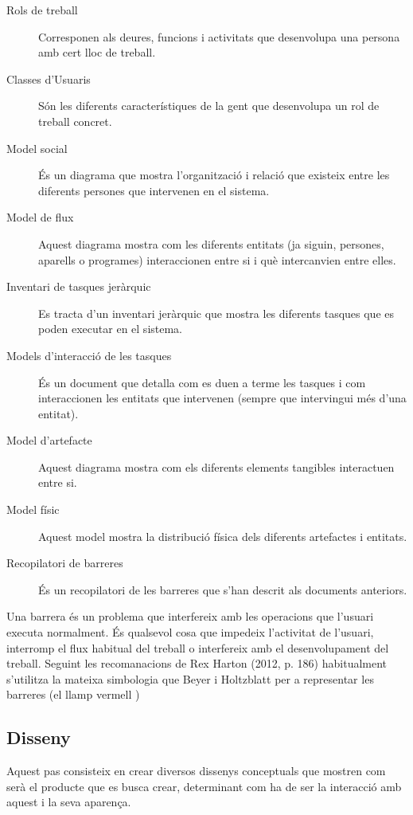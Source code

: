 \begin{description}
\item[Rols de treball] Corresponen als deures, funcions i activitats que desenvolupa una persona amb cert lloc de treball.
\item[Classes d'Usuaris] Són les diferents característiques de la gent que desenvolupa un rol de treball concret.
\item[Model social] És un diagrama que mostra l'organització i relació que existeix entre les diferents persones que intervenen en el sistema.
\item[Model de flux] Aquest diagrama mostra com les diferents entitats (ja siguin, persones, aparells o programes) interaccionen entre si i què intercanvien entre elles.
\item[Inventari de tasques jeràrquic] Es tracta d'un inventari jeràrquic que mostra les diferents tasques que es poden executar en el sistema.
\item[Models d'interacció de les tasques] És un document que detalla com es duen a terme les tasques i com interaccionen les entitats que intervenen (sempre que intervingui més d'una entitat).
\item[Model d'artefacte] Aquest diagrama mostra com els diferents elements tangibles interactuen entre si.
\item[Model físic] Aquest model mostra la distribució física dels diferents artefactes i entitats.
\item[Recopilatori de barreres] És un recopilatori de les barreres que s'han descrit als documents anteriors.
\end{description}

Una barrera és un problema que interfereix amb les operacions que l'usuari executa normalment. És qualsevol cosa que impedeix l'activitat de l'usuari, interromp el flux habitual del treball o interfereix amb el desenvolupament del treball. Seguint les recomanacions de Rex Harton (2012, p. 186) \cite{UX_Book} habitualment s'utilitza la mateixa simbologia que Beyer i Holtzblatt \cite{Contextual_Design} per a representar les barreres (el llamp vermell \barrier)

\subsection{Disseny}
Aquest pas consisteix en crear diversos dissenys conceptuals que mostren com serà el producte que es busca crear, determinant com ha de ser la interacció amb aquest i la seva aparença. 

